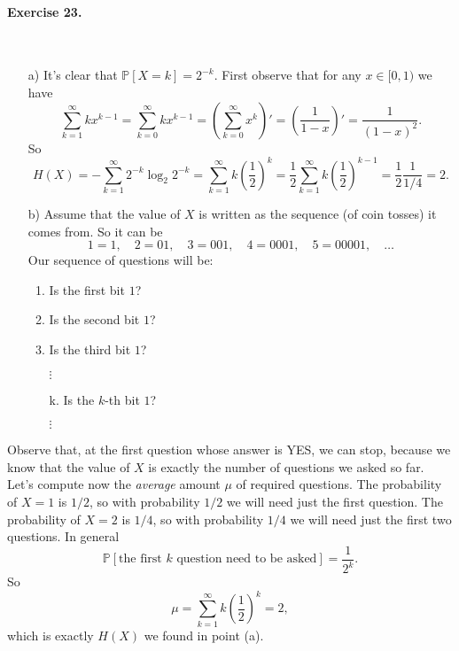 \documentclass[12pt,a4paper]{report}
\theoremstyle{definition}
\theoremstyle{num.custom-title}
\renewcommand{\1}{\mathbbm{1}}
\renewcommand{\P}{\mathbb{P}}
\begin{document}
\paragraph{Exercise 23.}\ 
\begin{itemize}
\item[a)] It's clear that $\P[X=k]=2^{-k}$. First observe that for any $x \in [0,1)$ we have
\[
\sum_{k=1}^\infty k x^{k-1} = \sum_{k=0}^\infty k x^{k-1} = \left( \sum_{k=0}^\infty x^k \right)' = \left( \frac{1}{1-x} \right)' = \frac{1}{(1-x)^2}.
\]
So
\[
H(X) = -\sum_{k=1}^\infty 2^{-k} \log_2 2^{-k} = \sum_{k=1}^\infty k \left( \frac{1}{2} \right)^k = \frac{1}{2} \sum_{k=1}^\infty k \left( \frac{1}{2} \right)^{k-1} = \frac{1}{2} \frac{1}{1/4} = 2.
\]
\item[b)] Assume that the value of $X$ is written as the sequence (of coin tosses) it comes from. So it can be
\[
1=1, \quad 2=01, \quad 3=001, \quad 4=0001, \quad 5=00001, \quad \ldots
\]
Our sequence of questions will be:
\begin{enumerate}
\item Is the first bit $1$?
\item Is the second bit $1$?
\item Is the third bit $1$?
\item[$\vdots$]
\item[k.] Is the $k$-th bit $1$?
\item[$\vdots$]
\end{enumerate}
\end{itemize}
Observe that, at the first question whose answer is YES, we can stop, because we know that the value of $X$ is exactly the number of questions we asked so far.\\
Let's compute now the \emph{average} amount $\mu$ of required questions. The probability of $X=1$ is $1/2$, so with probability $1/2$ we will need just the first question. The probability of $X=2$ is $1/4$, so with probability $1/4$ we will need just the first two questions. In general
\[
\P[\text{the first $k$ question need to be asked}] = \frac{1}{2^k}.
\]
So
\[
\mu = \sum_{k=1}^\infty k \left( \frac{1}{2} \right)^k = 2,
\]
which is exactly $H(X)$ we found in point (a).
\end{document}

